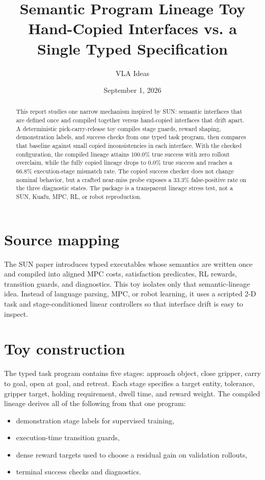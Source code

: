 \documentclass[11pt]{article}
\title{Semantic Program Lineage Toy\\\large Hand-Copied Interfaces vs. a Single Typed Specification}
\author{VLA Ideas}
\date{September 1, 2026}
\begin{document}
\maketitle
\begin{abstract}
This report studies one narrow mechanism inspired by SUN: semantic interfaces that are defined once and compiled together versus hand-copied interfaces that drift apart. A deterministic pick-carry-release toy compiles stage guards, reward shaping, demonstration labels, and success checks from one typed task program, then compares that baseline against small copied inconsistencies in each interface. With the checked configuration, the compiled lineage attains 100.0\% true success with zero rollout overclaim, while the fully copied lineage drops to 0.0\% true success and reaches a 66.8\% execution-stage mismatch rate. The copied success checker does not change nominal behavior, but a crafted near-miss probe exposes a 33.3\% false-positive rate on the three diagnostic states. The package is a transparent lineage stress test, not a SUN, Kuafu, MPC, RL, or robot reproduction.
\end{abstract}

\section{Source mapping}
The SUN paper introduces typed executables whose semantics are written once and compiled into aligned MPC costs, satisfaction predicates, RL rewards, transition guards, and diagnostics. This toy isolates only that semantic-lineage idea. Instead of language parsing, MPC, or robot learning, it uses a scripted 2-D task and stage-conditioned linear controllers so that interface drift is easy to inspect.

\section{Toy construction}
The typed task program contains five stages: approach object, close gripper, carry to goal, open at goal, and retreat. Each stage specifies a target entity, tolerance, gripper target, holding requirement, dwell time, and reward weight. The compiled lineage derives all of the following from that one program:
\begin{itemize}[leftmargin=1.5em]
  \item demonstration stage labels for supervised training,
  \item execution-time transition guards,
  \item dense reward targets used to choose a residual gain on validation rollouts,
  \item terminal success checks and diagnostics.
\end{itemize}
\end{document}

